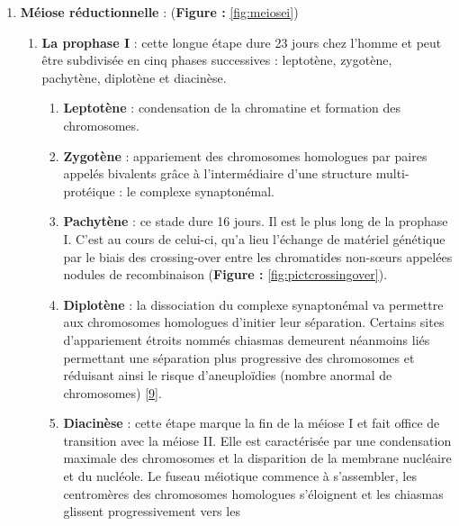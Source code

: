 \documentclass[12pt,a4paper,twoside]{ugathesis}
\providecommand{\tightlist}{%
  \setlength{\itemsep}{0pt}\setlength{\parskip}{0pt}}
\theoremstyle{definition}
\theoremstyle{definition}
\theoremstyle{definition}
\theoremstyle{remark}
\begin{document}
\begin{enumerate}
\def\labelenumi{\arabic{enumi}.}
\tightlist
\item
  \textbf{Méiose réductionnelle} : (\textbf{Figure : }\ref{fig:meiosei})

  \begin{enumerate}
  \def\labelenumii{\alph{enumii}.}
  \item
    \textbf{La prophase I} : cette longue étape dure 23 jours chez
    l'homme et peut être subdivisée en cinq phases successives :
    leptotène, zygotène, pachytène, diplotène et diacinèse.

    \begin{enumerate}
    \def\labelenumiii{\roman{enumiii}.}
    \tightlist
    \item
      \textbf{Leptotène} : condensation de la chromatine et formation
      des chromosomes.\\
    \item
      \textbf{Zygotène} : appariement des chromosomes homologues par
      paires appelés bivalents grâce à l'intermédiaire d'une structure
      multi-protéique : le complexe synaptonémal.\\
    \item
      \textbf{Pachytène} : ce stade dure 16 jours. Il est le plus long
      de la prophase I. C'est au cours de celui-ci, qu'a lieu l'échange
      de matériel génétique par le biais des crossing-over entre les
      chromatides non-sœurs appelées nodules de recombinaison
      (\textbf{Figure : }\ref{fig:pictcrossingover}).\\
    \item
      \textbf{Diplotène} : la dissociation du complexe synaptonémal va
      permettre aux chromosomes homologues d'initier leur séparation.
      Certains sites d'appariement étroits nommés chiasmas demeurent
      néanmoins liés permettant une séparation plus progressive des
      chromosomes et réduisant ainsi le risque d'aneuploïdies (nombre
      anormal de chromosomes)
      {[}\protect\hyperlink{ref-Handyside2012}{9}{]}.\\
    \item
      \textbf{Diacinèse} : cette étape marque la fin de la méiose I et
      fait office de transition avec la méiose II. Elle est caractérisée
      par une condensation maximale des chromosomes et la disparition de
      la membrane nucléaire et du nucléole. Le fuseau méiotique commence
      à s'assembler, les centromères des chromosomes homologues
      s'éloignent et les chiasmas glissent progressivement vers les

\end{enumerate}
\end{enumerate}
\end{enumerate}
\end{document}
